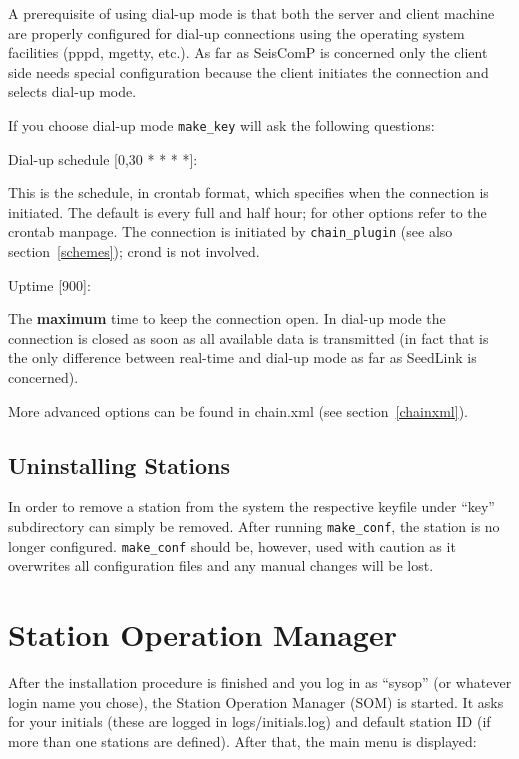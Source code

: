\documentclass[11pt,a4paper,titlepage]{article}
\begin{document}
A prerequisite of using dial-up mode is that both the server and
client machine are properly configured for dial-up connections using
the operating system facilities (pppd, mgetty, etc.). As far as
SeisComP is concerned only the client side needs special configuration
because the client initiates the connection and selects dial-up mode.

If you choose dial-up mode \verb+make_key+ will ask the following
questions:
\begin{interface}
\item Dial-up schedule [0,30 * * * *]:

This is the schedule, in crontab format, which specifies when the
connection is initiated. The default is every full and half hour; for
other options refer to the crontab manpage. The connection is
initiated by \verb+chain_plugin+ (see also section~\ref{schemes});
crond is not involved.

\item Uptime [900]:

The \textbf{maximum} time to keep the connection open. In dial-up mode
the connection is closed as soon as all available data is transmitted
(in fact that is the only difference between real-time and dial-up
mode as far as SeedLink is concerned).
\end{interface}

More advanced options can be found in chain.xml (see
section~\ref{chainxml}).

\subsection{Uninstalling Stations}

In order to remove a station from the system the respective keyfile
under ``key'' subdirectory can simply be removed. After running
\verb+make_conf+, the station is no longer configured. 
\verb+make_conf+ should be, however, used with caution as it
overwrites all configuration files and any manual changes will be lost.


\section{Station Operation Manager}\label{som}

After the installation procedure is finished and you log in as ``sysop''
(or whatever login name you chose), the Station Operation Manager (SOM) is
started. It asks for your initials (these are logged in logs/initials.log)
and default station ID (if more than one stations are defined). After
that, the main menu is displayed:
\end{document}

